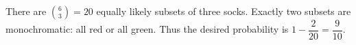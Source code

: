 There are $\binom63=20$ equally likely subsets of three socks. Exactly two subsets are monochromatic: all red or all green. Thus the desired probability is $1-\dfrac{2}{20}=\boxed{\dfrac{9}{10}}$.
